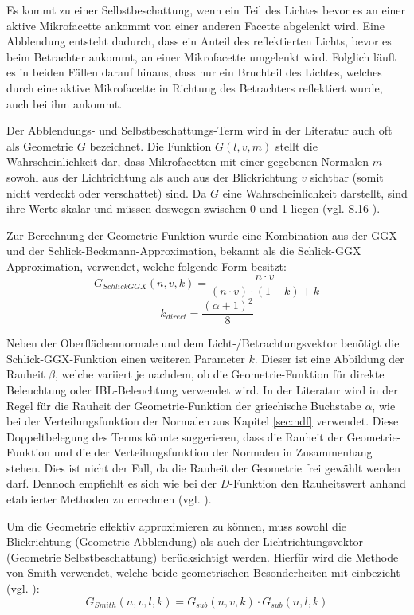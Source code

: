 \documentclass[
  11pt,
  a4paper,
  oneside
  ]{article}
\begin{document}
Es kommt zu einer Selbstbeschattung, wenn ein Teil des Lichtes bevor es an einer aktive Mikrofacette ankommt von einer anderen Facette abgelenkt wird. Eine Abblendung entsteht dadurch, dass ein Anteil des reflektierten Lichts, bevor es beim Betrachter ankommt, an einer Mikrofacette umgelenkt wird. Folglich läuft es in beiden Fällen darauf hinaus, dass nur ein Bruchteil des Lichtes, welches durch eine aktive Mikrofacette in Richtung des Betrachters reflektiert wurde, auch bei ihm ankommt. 

Der Abblendungs- und Selbstbeschattungs-Term wird in der Literatur auch oft als Geometrie $G$ bezeichnet. Die Funktion $G(l, v, m)$ stellt die Wahrscheinlichkeit dar, dass Mikrofacetten mit einer gegebenen Normalen $m$ sowohl aus der Lichtrichtung als auch aus der Blickrichtung $v$ sichtbar (somit nicht verdeckt oder verschattet) sind. Da $G$ eine Wahrscheinlichkeit darstellt, sind ihre Werte skalar und müssen deswegen zwischen 0 und 1 liegen (vgl. S.16 \cite{rtrPaper}). 

Zur Berechnung der Geometrie-Funktion wurde eine Kombination aus der GGX- und der Schlick-Beckmann-Approximation, bekannt als die Schlick-GGX Approximation, verwendet, welche folgende Form besitzt: 
\[G_{SchlickGGX}\left( n,v,k\right) =\dfrac{n\cdot v}{\left( n\cdot v\right) \cdot \left( 1-k\right) +k}\] %
\[k_{direct}=\dfrac{\left( \alpha +1\right) ^{2}}{8}\] %

Neben der Oberflächennormale und dem Licht-/Betrachtungsvektor benötigt die Schlick-GGX-Funktion einen weiteren Parameter $k$. Dieser ist eine Abbildung der Rauheit $\beta$, welche variiert je nachdem, ob die Geometrie-Funktion für direkte Beleuchtung oder IBL-Beleuchtung verwendet wird. In der Literatur wird in der Regel für die Rauheit der Geometrie-Funktion der griechische Buchstabe $\alpha$, wie bei der Verteilungsfunktion der Normalen aus Kapitel 
\ref{sec:ndf} verwendet. Diese Doppeltbelegung des Terms könnte suggerieren, dass die Rauheit der Geometrie-Funktion und die der Verteilungsfunktion der Normalen in Zusammenhang stehen. Dies ist nicht der Fall, da die Rauheit der Geometrie frei gewählt werden darf. Dennoch empfiehlt es sich wie bei der $D$-Funktion den Rauheitswert anhand etablierter Methoden zu errechnen (vgl. \cite{learnOpenGL}).

Um die Geometrie effektiv approximieren zu können, muss sowohl die Blickrichtung (Geometrie Abblendung) als auch der Lichtrichtungsvektor (Geometrie Selbstbeschattung) berücksichtigt werden. Hierfür wird die Methode von Smith verwendet, welche beide geometrischen Besonderheiten mit einbezieht (vgl. \cite{learnOpenGL}): 
\[G_{Smith}\left( n,v,l,k\right) =G_{sub}\left( n,v,k\right) \cdot G_{sub}\left( n,l,k\right)\]
\end{document}
